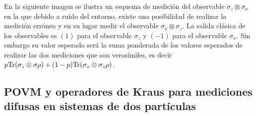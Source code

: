 En la siguiente imagen se ilustra un esquema de medición del observable
$\sigma_z\otimes \sigma_x$ en la que debido a ruido del entorno, existe una
posibilidad de realizar la medición errónea y en su lugar medir el observable
$\sigma_x\otimes \sigma_z$. La salida clásica de los observables es $(1)$  para
el observable $\sigma _z$ y $(-1)$ para el observable $\sigma_x$. Sin embargo
su valor esperado será la suma ponderada de los valores esperados de realizar
las dos mediciones que son verosímiles, es decir $p {\rm Tr}(\sigma_z\otimes \sigma
\rho )+ (1-p){\rm Tr}(\sigma_x\otimes\sigma_z \rho)$.


\subsection{POVM y operadores de Kraus para mediciones difusas en sistemas de dos partículas}\label{Sec_POVM_para_mediciones_difusas} %
 

